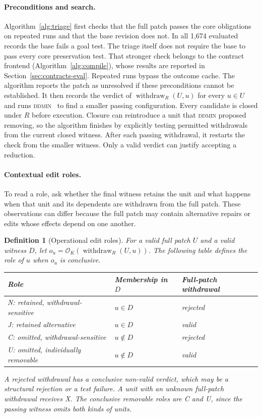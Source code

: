 \documentclass[a4paper,fleqn]{cas-sc}
\newcommand{\lab}[1]{\textsf{#1}}
\newcommand{\withdraw}{\operatorname{withdraw}}
\newtheorem{definition}{Definition}
\begin{document}
\paragraph{Preconditions and search.} Algorithm~\ref{alg:triage} first checks that the full patch passes the core obligations on repeated runs and that the base revision does not. In all 1,674 evaluated records the base fails a goal test. The triage itself does not require the base to pass every core preservation test. That stronger check belongs to the contract frontend (Algorithm~\ref{alg:compile}), whose results are reported in Section~\ref{sec:contracts-eval}. Repeated runs bypass the outcome cache. The algorithm reports the patch as unresolved if these preconditions cannot be established. It then records the verdict of $\withdraw_R(U,u)$ for every $u\in U$ and runs \textsc{ddmin}~\citep{zeller2002ddmin} to find a smaller passing configuration. Every candidate is closed under $R$ before execution. Closure can reintroduce a unit that \textsc{ddmin} proposed removing, so the algorithm finishes by explicitly testing permitted withdrawals from the current closed witness. After each passing withdrawal, it restarts the check from the smaller witness. Only a \lab{valid} verdict can justify accepting a reduction.

\paragraph{Contextual edit roles.} To read a role, ask whether the final witness retains the unit and what happens when that unit and its dependents are withdrawn from the full patch. These observations can differ because the full patch may contain alternative repairs or edits whose effects depend on one another.

\begin{definition}[Operational edit roles]\label{def:roles}
For a valid full patch $U$ and a valid witness $D$, let $o_u=\mathcal{O}_K(\withdraw_R(U,u))$. The following table defines the role of $u$ when $o_u$ is conclusive.
\begin{center}
\begin{tabular}{lll}
\toprule
Role & Membership in $D$ & Full-patch withdrawal \\
\midrule
\lab{N}: retained, withdrawal-sensitive & $u\in D$ & rejected \\
\lab{J}: retained alternative & $u\in D$ & valid \\
\lab{C}: omitted, withdrawal-sensitive & $u\notin D$ & rejected \\
\lab{U}: omitted, individually removable & $u\notin D$ & valid \\
\bottomrule
\end{tabular}
\end{center}
A rejected withdrawal has a conclusive non-valid verdict, which may be a structural rejection or a test failure. A unit with an unknown full-patch withdrawal receives \lab{X}. The conclusive removable roles are \lab{C} and \lab{U}, since the passing witness omits both kinds of units.
\end{definition}
\end{document}
